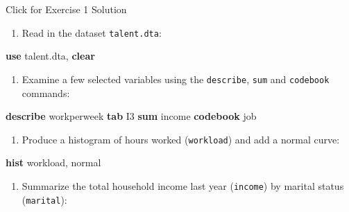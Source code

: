 \documentclass[
]{book}
\newenvironment{Shaded}{\begin{snugshade}}{\end{snugshade}}
\newcommand{\FunctionTok}[1]{\textcolor[rgb]{0.00,0.00,0.00}{#1}}
\newcommand{\KeywordTok}[1]{\textcolor[rgb]{0.13,0.29,0.53}{\textbf{#1}}}
\newcommand{\NormalTok}[1]{#1}
\providecommand{\tightlist}{%
  \setlength{\itemsep}{0pt}\setlength{\parskip}{0pt}}
\begin{document}
{Click for Exercise 1 Solution}

\begin{alert}

\begin{enumerate}
\def\labelenumi{\arabic{enumi}.}
\tightlist
\item
  Read in the dataset \texttt{talent.dta}:
\end{enumerate}

\begin{Shaded}
\begin{Highlighting}[]
\KeywordTok{use}\NormalTok{ talent.dta, }\KeywordTok{clear}
\end{Highlighting}
\end{Shaded}

\begin{enumerate}
\def\labelenumi{\arabic{enumi}.}
\setcounter{enumi}{1}
\tightlist
\item
  Examine a few selected variables using the \texttt{describe}, \texttt{sum} and \texttt{codebook} commands:
\end{enumerate}

\begin{Shaded}
\begin{Highlighting}[]
\KeywordTok{describe}\NormalTok{ workperweek}
\KeywordTok{tab}\NormalTok{ I3}
\KeywordTok{sum}\NormalTok{ income}
\KeywordTok{codebook}\NormalTok{ job}
\end{Highlighting}
\end{Shaded}

\begin{enumerate}
\def\labelenumi{\arabic{enumi}.}
\setcounter{enumi}{2}
\tightlist
\item
  Produce a histogram of hours worked (\texttt{workload}) and add a normal curve:
\end{enumerate}

\begin{Shaded}
\begin{Highlighting}[]
\KeywordTok{hist}\NormalTok{ workload, }\FunctionTok{normal} 
\end{Highlighting}
\end{Shaded}

\begin{enumerate}
\def\labelenumi{\arabic{enumi}.}
\setcounter{enumi}{3}
\tightlist
\item
  Summarize the total household income last year (\texttt{income}) by marital status (\texttt{marital}):
\end{enumerate}


\end{alert}
\end{document}
